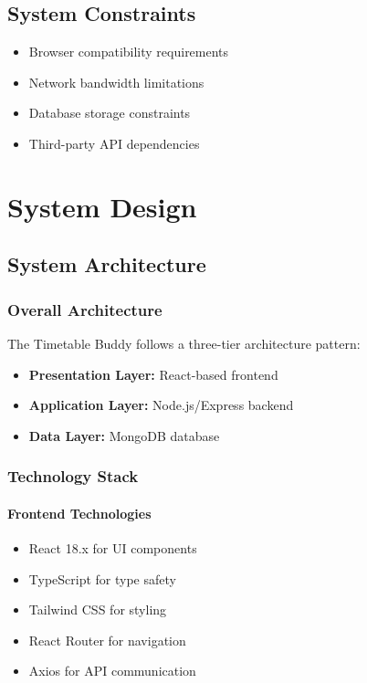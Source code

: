 \documentclass[12pt,a4paper]{report}
\begin{document}
\section{System Constraints}
\begin{itemize}[leftmargin=*]
    \item Browser compatibility requirements
    \item Network bandwidth limitations
    \item Database storage constraints
    \item Third-party API dependencies
\end{itemize}

\chapter{System Design}

\section{System Architecture}

\subsection{Overall Architecture}
The Timetable Buddy follows a three-tier architecture pattern:
\begin{itemize}[leftmargin=*]
    \item \textbf{Presentation Layer:} React-based frontend
    \item \textbf{Application Layer:} Node.js/Express backend
    \item \textbf{Data Layer:} MongoDB database
\end{itemize}

\subsection{Technology Stack}

\subsubsection{Frontend Technologies}
\begin{itemize}[leftmargin=*]
    \item React 18.x for UI components
    \item TypeScript for type safety
    \item Tailwind CSS for styling
    \item React Router for navigation
    \item Axios for API communication
\end{itemize}
\end{document}
